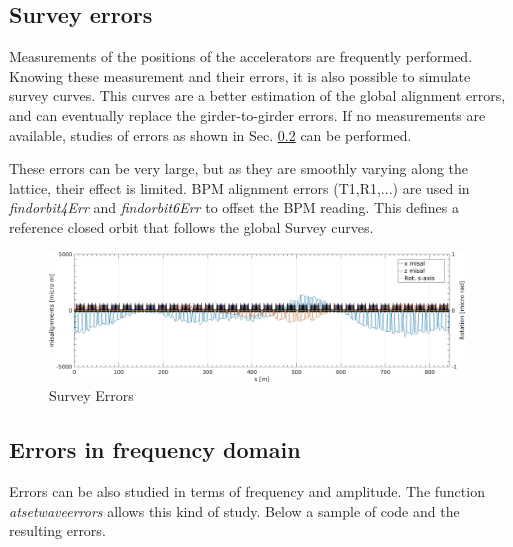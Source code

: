 \clearpage
\subsection{Survey errors}
Measurements of the positions of the accelerators are frequently performed. Knowing these measurement and their errors, it is also possible to simulate survey curves. This curves are a better estimation of the global alignment errors, and can eventually replace the girder-to-girder errors. If no measurements are available, studies of errors as shown in Sec. \ref{sec:ErrFreqDomain} can be performed. 

These errors can be very large, but as they are smoothly varying along the lattice, their effect is limited. BPM alignment errors (T1,R1,...) are used in \emph{findorbit4Err} and \emph{findorbit6Err} to offset the BPM reading. This defines a reference closed orbit that follows the global Survey curves. 


\begin{figure}[!h]
	\centering
	\includegraphics[width=0.98\textwidth]{./images/Survey/SurveyErrors.jpg}
	\caption{Survey Errors}
	\label{fig:girdxyrol}
\end{figure}


\subsection{Errors in frequency domain}
\label{sec:ErrFreqDomain}
Errors can be also studied in terms of frequency and amplitude. The function \emph{atsetwaveerrors} allows this kind of study. Below a sample of code and the resulting errors.

